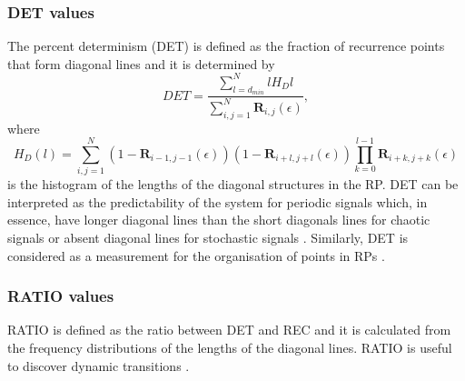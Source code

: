 \documentclass[fleqn,10pt]{wlscirep}
\begin{document}
\subsubsection*{DET values} 
The percent determinism (DET) is defined as the fraction of recurrence points that form diagonal lines and it is determined by
\begin{equation}
DET=
	\frac{\sum^{N}_{l=d_{min}} l H_D{l} }
	     {\sum^{N}_{i,j=1} \mathbf{R}_{i,j}(\epsilon) },
\end{equation}
where 
\begin{equation}
H_D(l) = 
	\sum^{N}_{i,j=1} 
	(1- \mathbf{R}_{i-1,j-1}(\epsilon) ) 
	(1- \mathbf{R}_{i+l,j+l}(\epsilon) ) 
	\prod^{l-1}_{k=0}  \mathbf{R}_{i+k,j+k}(\epsilon)
\end{equation}
is the histogram of the lengths of the diagonal structures in the RP.
DET can be interpreted as the predictability of the system for periodic signals which, in essence, have longer diagonal lines than the short diagonals lines for chaotic signals or absent diagonal lines for stochastic signals \cite{marwan2007, marwan2015}.
Similarly, DET is considered as a measurement for the organisation of points in RPs  \cite{iwanski1998}.


\subsubsection*{RATIO values}
RATIO is defined as the ratio between DET and REC and it is calculated from the frequency distributions of the lengths of the diagonal lines.
RATIO is useful to discover dynamic transitions \cite{marwan2015}.
% 
%
%
\end{document}
